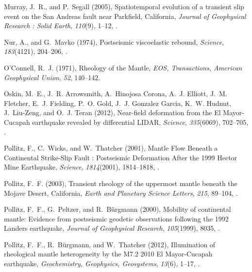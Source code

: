 \documentclass[draft,linenumbers]{AGUJournal}
\begin{document}
\begin{thebibliography}{52}
Murray, J.~R., and P.~Segall (2005), {Spatiotemporal evolution of a transient
  slip event on the San Andreas fault near Parkfield, California},
  \textit{Journal of Geophysical Research : Solid Earth}, \textit{110}(9),
  1--12, .

Nur, A., and G.~Mavko (1974), {Postseismic viscoelastic rebound},
  \textit{Science}, \textit{183}(4121), 204--206, .

O'Connell, R.~J. (1971), {Rheology of the Mantle}, \textit{EOS, Transactions,
  American Geophysical Union}, \textit{52}, 140--142.

Oskin, M.~E., J.~R. Arrowsmith, A.~{Hinojosa Corona}, A.~J. Elliott, J.~M.
  Fletcher, E.~J. Fielding, P.~O. Gold, J.~J. {Gonzalez Garcia}, K.~W. Hudnut,
  J.~Liu-Zeng, and O.~J. Teran (2012), {Near-field deformation from the El
  Mayor-Cucapah earthquake revealed by differential LIDAR}, \textit{Science},
  \textit{335}(6069), 702--705, .

Pollitz, F., C.~Wicks, and W.~Thatcher (2001), {Mantle Flow Beneath a
  Continental Strike-Slip Fault : Postseismic Deformation After the 1999 Hector
  Mine Earthquake}, \textit{Science}, \textit{1814}(2001), 1814--1818,
  .

Pollitz, F.~F. (2003), {Transient rheology of the uppermost mantle beneath the
  Mojave Desert, California}, \textit{Earth and Planetary Science Letters},
  \textit{215}, 89--104, .

Pollitz, F.~F., G.~Peltzer, and R.~B{\"{u}}rgmann (2000), {Mobility of
  continental mantle: Evidence from postseismic geodetic observations following
  the 1992 Landers earthquake}, \textit{Journal of Geophysical Research},
  \textit{105}(1999), 8035, .

Pollitz, F.~F., R.~B{\"{u}}rgmann, and W.~Thatcher (2012), {Illumination of
  rheological mantle heterogeneity by the M7.2 2010 El Mayor-Cucapah
  earthquake}, \textit{Geochemistry, Geophysics, Geosystems}, \textit{13}(6),
  1--17, .


\end{thebibliography}
\end{document}
